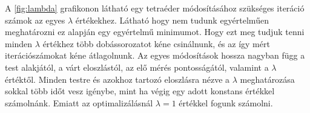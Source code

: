 A \ref{fig:lambda} grafikonon látható egy tetraéder módosításához szükséges iteráció számok az egyes $\lambda$ értékekhez.
Látható hogy nem tudunk egyértelműen meghatározni ez alapján egy egyértelmű minimumot.
Hogy ezt meg tudjuk tenni minden $\lambda$ értékhez több dobássorozatot kéne csinálnunk, és az így mért iterációszámokat kéne átlagolnunk.
Az egyes módosítások hossza nagyban függ a test alakjától, a várt eloszlástól, az elő mérés pontosságától, valamint a $\lambda$ értéktől.
Minden testre és azokhoz tartozó eloszlásra nézve a $\lambda$ meghatározása sokkal több időt vesz igénybe, mint ha végig egy adott konstans értékkel számolnánk.
Emiatt az optimalizálásnál $\lambda = 1$ értékkel fogunk számolni.